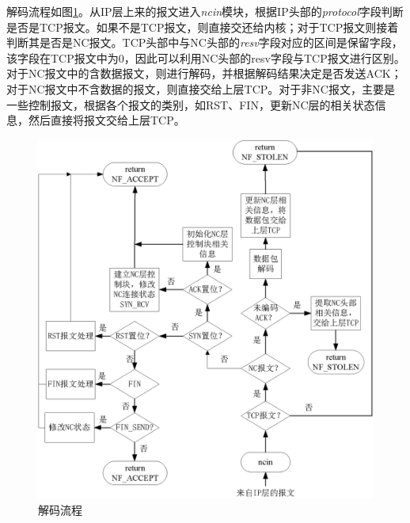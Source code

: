 \par
解码流程如图\ref{JIEMALC_EPS}。从IP层上来的报文进入\emph{ncin}模块，根据IP头部的\emph{protocol}字段判断是否是TCP报文。如果不是TCP报文，则直接交还给内核；对于TCP报文则接着判断其是否是NC报文。TCP头部中与NC头部的\emph{resv}字段对应的区间是保留字段，该字段在TCP报文中为0，因此可以利用NC头部的resv字段与TCP报文进行区别。对于NC报文中的含数据报文，则进行解码，并根据解码结果决定是否发送ACK；对于NC报文中不含数据的报文，则直接交给上层TCP。对于非NC报文，主要是一些控制报文，根据各个报文的类别，如RST、FIN，更新NC层的相关状态信息，然后直接将报文交给上层TCP。
\begin{figure}[htbp] 
	\centering
	\includegraphics[width=6in]{figures/decodelc.eps}
	\caption{解码流程}
	\label{JIEMALC_EPS}
\end{figure}
